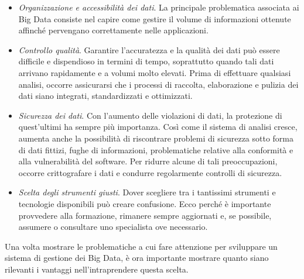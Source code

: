 \begin{itemize}
    \item \textit{Organizzazione e accessibilità dei dati}. La principale problematica associata ai Big Data consiste nel capire come gestire il volume di informazioni ottenute affinché pervengano correttamente nelle applicazioni.
    \item \textit{Controllo qualità}. Garantire l'accuratezza e la qualità dei dati può essere difficile e dispendioso in termini di tempo, soprattutto quando tali dati arrivano rapidamente e a volumi molto elevati. Prima di effettuare qualsiasi analisi, occorre assicurarsi che i processi di raccolta, elaborazione e pulizia dei dati siano integrati, standardizzati e ottimizzati.
    \item \textit{Sicurezza dei dati}. Con l'aumento delle violazioni di dati, la protezione di quest'ultimi ha sempre più importanza. Così come il sistema di analisi cresce, aumenta anche la possibilità di riscontrare problemi di sicurezza sotto forma di dati fittizi, fughe di informazioni, problematiche relative alla conformità e alla vulnerabilità del software. Per ridurre alcune di tali preoccupazioni, occorre crittografare i dati e condurre regolarmente controlli di sicurezza.
    \item \textit{Scelta degli strumenti giusti}. Dover scegliere tra i tantissimi strumenti e tecnologie disponibili può creare confusione. Ecco perché è importante provvedere alla formazione, rimanere sempre aggiornati e, se possibile, assumere o consultare uno specialista ove necessario.
\end{itemize}

Una volta mostrare le problematiche a cui fare attenzione per sviluppare un sistema di gestione dei Big Data, è ora importante mostrare quanto siano rilevanti i vantaggi nell'intraprendere questa scelta.\cite{oracle_big_data}

